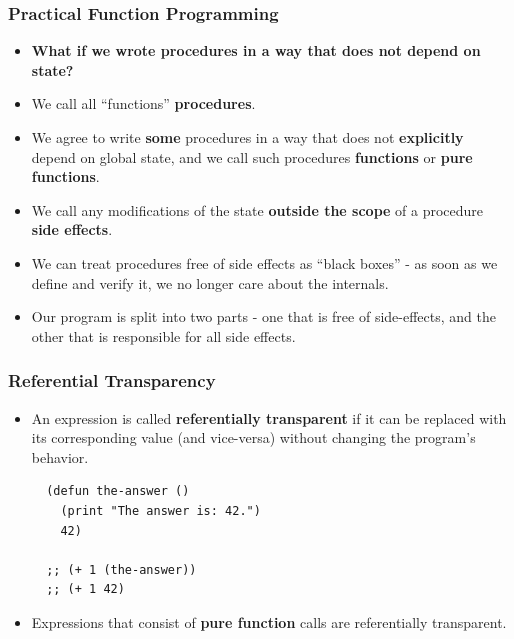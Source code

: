\documentclass{beamer}
\begin{document}
    
\begin{frame}[fragile]
  \frametitle{Practical Function Programming}
  \begin{itemize}
  \item \textbf{What if we wrote procedures in a way that does not depend on
      state?}
  \item We call all ``functions'' \textbf{procedures}.
  \item We agree to write \textbf{some} procedures in a way that does not
    \textbf{explicitly} depend on global state, and we call such procedures
    \textbf{functions} or \textbf{pure functions}.
  \item We call any modifications of the state \textbf{outside the scope} of a
    procedure \textbf{side effects}.
  \item We can treat procedures free of side effects as ``black boxes'' - as
    soon as we define and verify it, we no longer care about the internals.
  \item Our program is split into two parts - one that is free of side-effects,
    and the other that is responsible for all side effects.
  \end{itemize}
\end{frame}

\begin{frame}[fragile]
  \frametitle{Referential Transparency}
  \begin{itemize}
  \item An expression is called \textbf{referentially transparent} if it can be
    replaced with its corresponding value (and vice-versa) without changing the
    program's behavior.
\begin{verbatim}
  (defun the-answer ()
    (print "The answer is: 42.")
    42)

  ;; (+ 1 (the-answer))
  ;; (+ 1 42)
\end{verbatim}
  \item Expressions that consist of \textbf{pure function} calls are
    referentially transparent.
  \end{itemize}
\end{frame}
\end{document}
